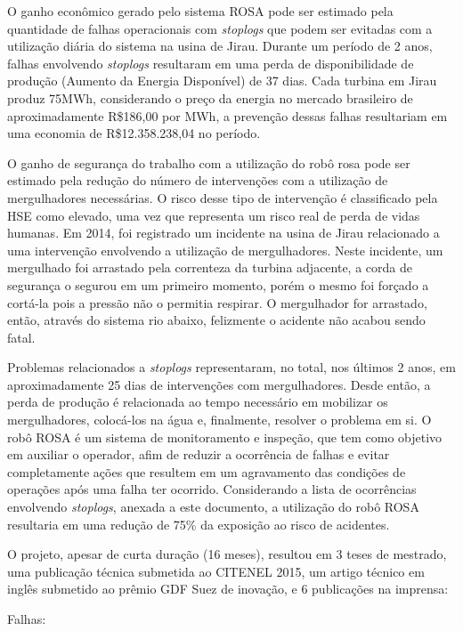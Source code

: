 \begin{itemize}
O ganho econômico gerado pelo sistema ROSA pode ser estimado pela quantidade de
falhas operacionais com \textit{stoplogs} que podem ser evitadas com a
utilização diária do sistema na usina de Jirau. Durante um período de 2 anos,
falhas envolvendo \textit{stoplogs} resultaram em uma perda de disponibilidade
de produção (Aumento da Energia Disponível) de 37 dias. Cada turbina
em Jirau produz 75MWh, considerando o preço da energia no mercado brasileiro de
aproximadamente R\$186,00 por MWh, a prevenção dessas falhas resultariam em uma
economia de R\$12.358.238,04 no período.

O ganho de segurança do trabalho com a utilização do robô rosa pode ser estimado
pela redução do número de intervenções com a utilização de mergulhadores
necessárias. O risco desse tipo de intervenção é classificado pela HSE como
elevado, uma vez que representa um risco real de perda de vidas humanas. Em
2014, foi registrado um incidente na usina de Jirau relacionado a uma
intervenção envolvendo a utilização de mergulhadores. Neste incidente, um
mergulhado foi arrastado pela correnteza da turbina adjacente, a corda de
segurança o segurou em um primeiro momento, porém o mesmo foi forçado a cortá-la
pois a pressão não o permitia respirar. O mergulhador for arrastado, então,
através do sistema rio abaixo, felizmente o acidente não acabou sendo fatal.

Problemas relacionados a \textit{stoplogs} representaram, no total, nos últimos
2 anos, em aproximadamente 25 dias de intervenções com mergulhadores. Desde
então, a perda de produção é relacionada ao tempo necessário em mobilizar os
mergulhadores, colocá-los na água e, finalmente, resolver o problema em si. O
robô ROSA é um sistema de monitoramento e inspeção, que tem como objetivo
em auxiliar o operador, afim de reduzir a ocorrência de falhas e evitar
completamente ações que resultem em um agravamento das condições de operações
após uma falha ter ocorrido. Considerando a lista de ocorrências envolvendo
\textit{stoplogs}, anexada a este documento, a utilização do robô ROSA
resultaria em uma redução de 75\% da exposição ao risco de acidentes. 

O projeto, apesar de curta duração (16 meses), resultou em 3 teses de 
mestrado, uma publicação técnica submetida ao CITENEL 2015, um artigo técnico 
em inglês submetido ao prêmio GDF Suez de inovação, e 6 publicações na imprensa: 

Falhas:


\end{itemize}
